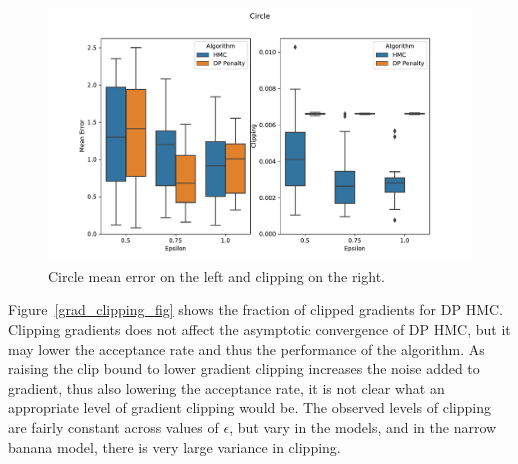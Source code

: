 \documentclass[english,twoside,openright]{HYgraduMLDS}
\begin{document}
\begin{figure}
  \centering
  \includegraphics[width=\textwidth]{figures/circle}
  \caption{
    Circle mean error on the left and clipping on the right.
  }
  \label{circle_fig}
\end{figure}

Figure~\ref{grad_clipping_fig} shows the fraction of clipped
gradients for DP HMC. Clipping gradients does not affect the asymptotic
convergence of DP HMC, but it may lower the acceptance rate and thus
the performance of the algorithm. As raising the clip bound to lower
gradient clipping increases the noise added to gradient, thus also lowering
the acceptance rate, it is not clear what an appropriate level of gradient
clipping would be. The observed levels of clipping are fairly constant across
values of \(\epsilon\), but vary in the models, and in the narrow banana model,
there is very large variance in clipping.
\end{document}
